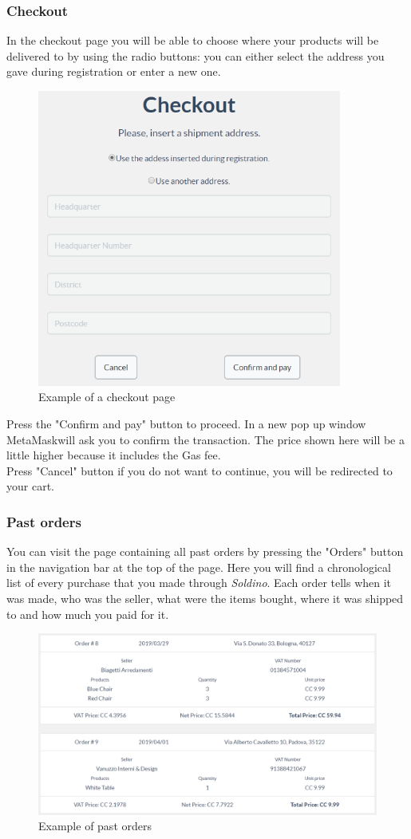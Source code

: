 	\subsubsection{Checkout}
	In the checkout page you will be able to choose where your products will be 
	delivered to by using the radio buttons: you can either select the address 
	you gave during registration or enter a new one.\\
	\begin{figure}[H]
		\includegraphics[width=10cm]{res/images/checkout.png}
		\centering
		\caption{Example of a checkout page}
	\end{figure}
	\noindent Press the "Confirm and pay" button to proceed. In a new 
	pop up window MetaMask\glosp will ask you to confirm the transaction. The price 
	shown here will be a little higher because it includes the Gas fee. \\
	Press "Cancel" button if you do not want to continue, you will be redirected to your cart.
	\subsubsection{Past orders}
	You can visit the page containing all past orders by pressing the "Orders" 
	button in the navigation bar at the top of the page.
%
	Here you will find a chronological list of every purchase that you made through 
	\textit{Soldino}. Each order tells when it was made, who was the seller, 
	what were the items bought, where it was shipped to and how much you paid for it.
	\begin{figure}[H]
		\includegraphics[width=15cm]{res/images/past_orders.png}
		\centering
		\caption{Example of past orders}
	\end{figure}